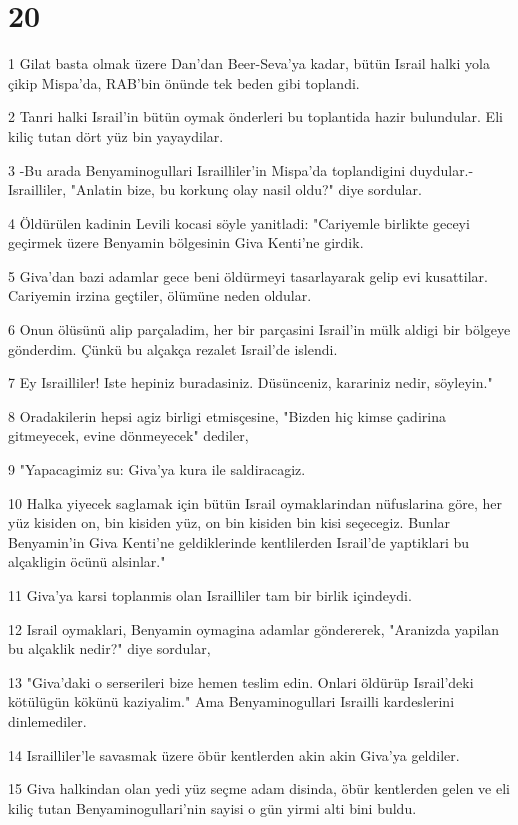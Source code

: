 \chapter{20}

\par 1 Gilat basta olmak üzere Dan'dan Beer-Seva'ya kadar, bütün Israil halki yola çikip Mispa'da, RAB'bin önünde tek beden gibi toplandi.
\par 2 Tanri halki Israil'in bütün oymak önderleri bu toplantida hazir bulundular. Eli kiliç tutan dört yüz bin yayaydilar.
\par 3 -Bu arada Benyaminogullari Israilliler'in Mispa'da toplandigini duydular.- Israilliler, "Anlatin bize, bu korkunç olay nasil oldu?" diye sordular.
\par 4 Öldürülen kadinin Levili kocasi söyle yanitladi: "Cariyemle birlikte geceyi geçirmek üzere Benyamin bölgesinin Giva Kenti'ne girdik.
\par 5 Giva'dan bazi adamlar gece beni öldürmeyi tasarlayarak gelip evi kusattilar. Cariyemin irzina geçtiler, ölümüne neden oldular.
\par 6 Onun ölüsünü alip parçaladim, her bir parçasini Israil'in mülk aldigi bir bölgeye gönderdim. Çünkü bu alçakça rezalet Israil'de islendi.
\par 7 Ey Israilliler! Iste hepiniz buradasiniz. Düsünceniz, karariniz nedir, söyleyin."
\par 8 Oradakilerin hepsi agiz birligi etmisçesine, "Bizden hiç kimse çadirina gitmeyecek, evine dönmeyecek" dediler,
\par 9 "Yapacagimiz su: Giva'ya kura ile saldiracagiz.
\par 10 Halka yiyecek saglamak için bütün Israil oymaklarindan nüfuslarina göre, her yüz kisiden on, bin kisiden yüz, on bin kisiden bin kisi seçecegiz. Bunlar Benyamin'in Giva Kenti'ne geldiklerinde kentlilerden Israil'de yaptiklari bu alçakligin öcünü alsinlar."
\par 11 Giva'ya karsi toplanmis olan Israilliler tam bir birlik içindeydi.
\par 12 Israil oymaklari, Benyamin oymagina adamlar göndererek, "Aranizda yapilan bu alçaklik nedir?" diye sordular,
\par 13 "Giva'daki o serserileri bize hemen teslim edin. Onlari öldürüp Israil'deki kötülügün kökünü kaziyalim." Ama Benyaminogullari Israilli kardeslerini dinlemediler.
\par 14 Israilliler'le savasmak üzere öbür kentlerden akin akin Giva'ya geldiler.
\par 15 Giva halkindan olan yedi yüz seçme adam disinda, öbür kentlerden gelen ve eli kiliç tutan Benyaminogullari'nin sayisi o gün yirmi alti bini buldu.
